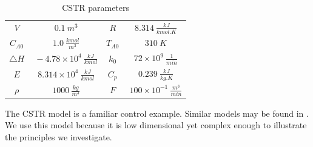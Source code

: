 \documentclass[../masters.tex]{subfiles}
\begin{document}
\begin{table}[H]
\begin{center}
\begin{tabular}{c c c c}
\hline
$V$ & $~0.1~m^3$ & $R$ & $~8.314~\frac{kJ}{kmol.K}$ \\
$C_{A0}$ & $~1.0~\frac{kmol}{m^3}$ &$T_{A0}$ & $~310~K$ \\
$\triangle H$ & $~-4.78\times 10^{4}~\frac{kJ}{kmol}$ & $k_{0}$ & $~72\times 10^{9}~\frac{1}{min}$ \\
$E$ & $~8.314\times 10^4~\frac{kJ}{kmol}$ & $C_{p}$ & $~0.239~\frac{kJ}{kg.K}$ \\
$\rho$ & $~1000~\frac{kg}{m^3}$ & 
$F$ & $~100\times 10^{-1}~\frac{m^3}{min}$ \\
\hline
\end{tabular}
\caption{CSTR parameters}
\label{tab_params}
\end{center}
\end{table}
The CSTR model is a familiar control example. Similar models may be found in \cite{du}\cite{cervantes}\cite{pan}\cite{yazdi}. We use this model because it is low dimensional yet complex enough to illustrate the principles we investigate.  
\end{document}
